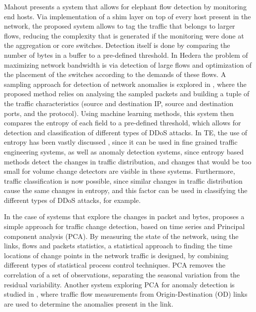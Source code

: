 \par Mahout \cite{curtis_mahout:_2011} presents a system that allows for elephant flow detection by monitoring end hosts. Via implementation of a shim layer on top
of every host present in the network, the proposed system allows to tag the traffic that belongs to larger flows, reducing the complexity that is generated 
if the monitoring were done at the aggregation or core switches. Detection itself is done by comparing the number of bytes in a buffer to a pre-defined threshold.
In Hedera \cite{al-fares_hedera:_2010} the problem of maximizing network bandwidth is via detection of large flows and optimization of the placement of the 
switches according to the demands of these flows. A sampling approach for detection of network anomalies is explored in \cite{jun_ddos_2014}, where the 
proposed method relies on analysing the sampled packets and building a tuple of the traffic characteristics (source and destination IP, source and 
destination ports, and the protocol). Using machine learning methods, this system then compares the entropy of each field to a pre-defined threshold, which
allows for detection and classification of different types of DDoS attacks. In TE, the use of entropy has been vastly discussed \cite{brauckhoff_impact_2006,
lall_data_2006}, since it can be used in fine grained traffic engineering systems, as well as anomaly detection systems, since entropy based methods
detect the changes in traffic distribution, and changes that would be too small for volume change detectors are visible in these systems. Furthermore, traffic
classification is now possible, since similar changes in traffic distribution cause the same changes in entropy, and this factor can be used in classifying the 
different types of DDoS attacks, for example.

\par In the case of systems that explore the changes in packet and bytes, \cite{munz_traffic_2010} proposes a simple approach for traffic change detection, based on
time series and Principal component analysis (PCA). By measuring the state of the network, using the links, flows and packets statistics, a statistical approach to 
finding the time locations of change points in the network traffic is designed, by combining different types of statistical process control techniques.
PCA removes the correlation of a set of observations, separating the seasonal variation from the residual variability. Another system exploring PCA for anomaly
detection is studied in \cite{lakhina_characterization_2004}, where traffic flow measurements from Origin-Destination (OD) links are used to determine the anomalies
present in the link. 

